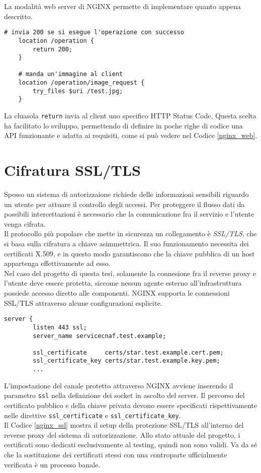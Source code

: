 La modalità web server di NGINX permette di implementare quanto appena descritto.
\lstset{language=nginx}
\begin{lstlisting}[caption={Frammento di codice del service server},captionpos=b,label=nginx_web]
    # invia 200 se si esegue l'operazione con successo
    location /operation {
        return 200;
    }

    # manda un'immagine al client
    location /operation/image_request {
        try_files $uri /test.jpg;
    }
\end{lstlisting}
La cluasola \texttt{return} invia al client uno specifico HTTP Status Code,  
Questa scelta ha facilitato lo sviluppo, permettendo di definire in poche righe di codice una API funzionante e adatta ai requisiti,  
come si può vedere nel Codice \ref*{nginx_web}.

\section{Cifratura SSL/TLS}
Spesso un sistema di autorizzaione richiede delle informazioni sensibili riguardo un utente per attuare il controllo 
degli accessi. 
Per proteggere il flusso dati da possibili intercettazioni è necessario che la comunicazione fra il servizio e l'utente venga cifrata. 
\\ Il protocollo più popolare che mette in sicurezza un collegamento \newline è \textit{SSL/TLS}, che si basa sulla cifratura a chiave asimmettrica. Il suo funzionamento necessita 
dei certificati X.509, e in questo modo garantiscono che la chiave pubblica di un host appartenga effettivamente ad esso. 
\\ Nel caso del progetto di questa tesi, solamente la connesione fra il reverse proxy e l'utente deve essere protetta, siccome nessun agente esterno
 all'infrastruttura possiede accesso diretto alle componenti.
NGINX supporta le connessioni SSL/TLS attraverso alcune configurazioni esplicite.

\begin{lstlisting}[caption={Configurazione di SSL},captionpos=b,label=nginx_ssl]
    server {
        listen 443 ssl;
        server_name servicecnaf.test.example;
        
        ssl_certificate     certs/star.test.example.cert.pem;
        ssl_certificate_key certs/star.test.example.key.pem;
        ...
\end{lstlisting}
L'impostazione del canale protetto attraverso NGINX avviene inserendo il parametro \texttt{ssl} nella definizione 
dei socket in ascolto del server. Il percorso del certificato pubblico e della chiave privata devono essere specificati 
rispettivamente nelle direttive \texttt{ssl\_certificate} e \texttt{ssl\_certificate\_key}. \\
Il Codice \ref*{nginx_ssl} mostra il setup della protezione SSL/TLS all'interno del reverse proxy del sistema di autorizzazione.
Allo stato attuale del progetto, i certificati sono dedicati esclusivamente al testing, quindi non sono validi. Va da sé che 
la sostituzione dei certificati stessi
con una controparte ufficialmente verificata è un processo banale.  


